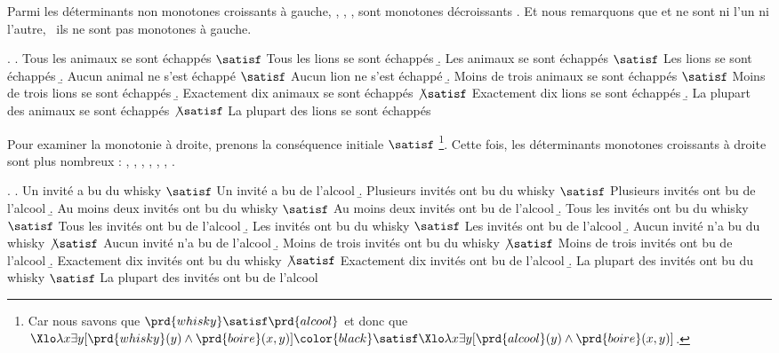 Parmi les déterminants non monotones croissants à gauche, , , ,  sont monotones décroissants %
\Next[a-d].
Et nous remarquons que  et  ne sont ni l'un ni l'autre, \ie\ ils ne sont pas monotones à gauche.

\ex.
\a. %
Tous les animaux  se sont échappés $\satisf$ Tous les lions se sont échappés
\b. Les animaux  se sont échappés $\satisf$ Les lions se sont échappés
\b. Aucun animal ne s'est échappé $\satisf$ Aucun lion ne s'est échappé
\b. Moins de trois animaux se sont échappés $\satisf$ Moins de trois lions se sont échappés
\b. Exactement dix  animaux  se sont échappés $\not\satisf$ Exactement dix lions se sont échappés
\b. La plupart des animaux  se sont échappés $\not\satisf$ La plupart des lions se sont échappés



Pour examiner la monotonie à droite, prenons la conséquence initiale  $\satisf$ \footnote{Car nous savons que $\prd{whisky}\satisf\prd{alcool}$ et donc que $\Xlo\lambda x\exists y[\prd{whisky}(y)\wedge\prd{boire}(x,y)] \color{black}\satisf \Xlo\lambda x\exists y[\prd{alcool}(y)\wedge\prd{boire}(x,y)]$.}.
Cette fois, les déterminants monotones croissants à droite sont plus nombreux : , , , , , , \Next[a-e,i].  



\ex.
\a. Un invité a bu du whisky $\satisf$ Un invité a bu de l'alcool
\b. Plusieurs invités ont bu du whisky $\satisf$ Plusieurs invités ont bu de l'alcool
\b. Au moins deux invités ont bu du whisky $\satisf$ Au moins deux invités ont bu de l'alcool
\b. Tous les invités ont bu du whisky $\satisf$ Tous les invités ont bu de l'alcool
\b. Les invités ont bu du whisky $\satisf$ Les invités ont bu de l'alcool
\b. Aucun invité n'a bu du whisky $\not\satisf$ Aucun invité n'a bu de l'alcool
\b. Moins de trois invités ont bu du whisky $\not\satisf$ Moins de trois invités ont bu de l'alcool
\b. Exactement dix invités ont bu du whisky $\not\satisf$ Exactement dix invités ont bu de l'alcool
\b. La plupart des invités ont bu du whisky $\satisf$ La plupart des invités ont bu de l'alcool


